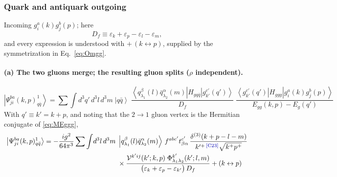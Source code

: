 \documentclass[11pt]{article}
\newcommand{\eps}{\varepsilon}
\newcommand{\dthree}{\delta^{(3)}}
\newcommand{\ket}[1]{\left|#1\right\rangle}
\newcommand{\bra}[1]{\left\langle#1\right|}
\newcommand{\Ph}{\Phi}
\newcommand{\Vg}{\mathcal{V}}
\newcommand{\qk}[3]{q^{#1}_{#2}(#3)}
\newcommand{\aqk}[3]{\bar q^{#1}_{#2}(#3)}
\newcommand{\gl}[3]{g^{#1}_{#2}(#3)}
\newcommand{\chg}[1]{{\color{blue!70!black}\textsuperscript{\,[C#1]}}}
\begin{document}
\subsubsection{Quark and antiquark outgoing}

Incoming $\gl{a}{i}{k}\gl{b}{j}{p}$; here
\begin{equation}
D_{f}\equiv\eps_{k}+\eps_{p}-\eps_{l}-\eps_{m},
\end{equation}
and every expression is understood with $+\,(k\leftrightarrow p)$, supplied by the symmetrization
in Eq.~\eqref{eq:Omgg}.

\paragraph{(a) The two gluons merge; the resulting gluon splits ($\rho$ independent).}
\begin{center}
\end{center}
\begin{equation}
\ket{\Psi^{ba}_{ji}(k,p)^{1}_{q\bar q}}=\sum\int\! d^{3}q'\,d^{3}l\,d^{3}m\;
\ket{q\bar q}\;
\frac{\bra{\qk{\beta}{\lambda_{1}}{l}\aqk{\alpha}{\lambda_{2}}{m}}H_{gq\bar q}\ket{\gl{c'}{k'}{q'}}}
{D_{f}}\;
\frac{\bra{\gl{c'}{k'}{q'}}H_{ggg}\ket{\gl{a}{i}{k}\gl{b}{j}{p}}}{E_{gg}(k,p)-E_{g}(q')}
\end{equation}
With $q'\equiv k'=k+p$, and noting that the $2\to1$ gluon vertex is the Hermitian conjugate of
\eqref{eq:MEggg},
\begin{align}
\ket{\Psi^{ba}_{ji}(k,p)^{1}_{q\bar q}}=-\frac{ig^{2}}{64\pi^{3}}\sum\int\!d^{3}l\,d^{3}m\;
&\ket{\qk{\beta}{\lambda_{1}}{l}\aqk{\alpha}{\lambda_{2}}{m}}\,f^{abc'}t^{c'}_{\beta\alpha}\,
\frac{\dthree(k+p-l-m)}{k'^{+}\chg{23}\sqrt{k^{+}p^{+}}}
\nonumber\\&\times
\frac{\Vg^{k'ij}(k';k,p)\;\Ph^{k'}_{\lambda_{1}\lambda_{2}}(k';l,m)}
{\big(\eps_{k}+\eps_{p}-\eps_{k'}\big)\,D_{f}}+(k\leftrightarrow p)
\label{eq:C1a}
\end{align}
\end{document}
